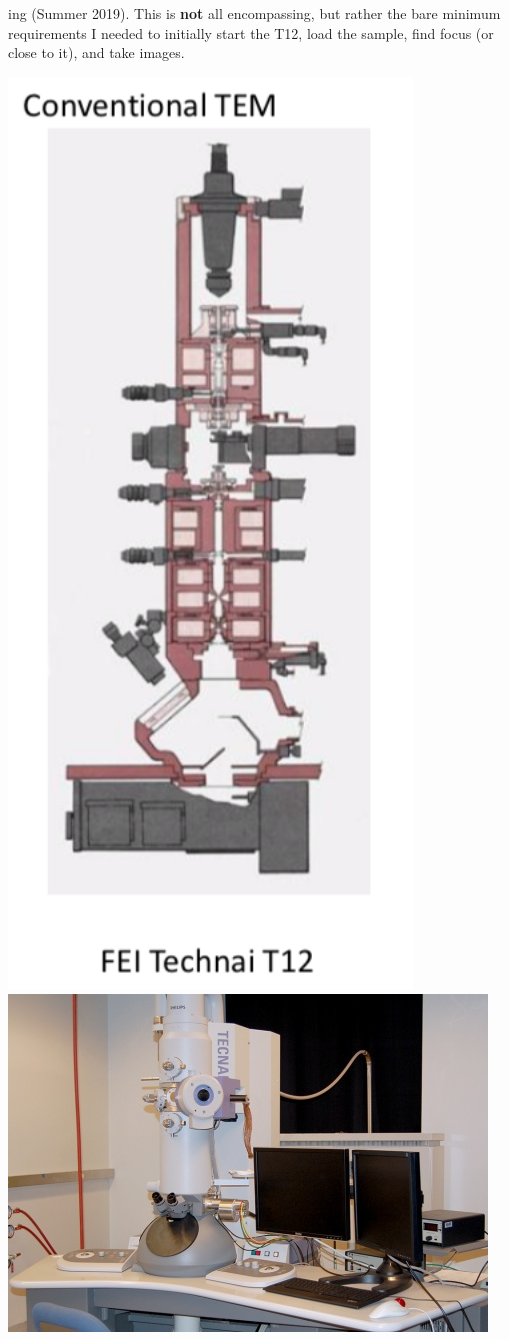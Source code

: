 \documentclass[]{book}
\begin{document}
ing (Summer 2019). This is \textbf{not} all encompassing, but rather the bare minimum requirements I needed to initially start the T12, load the sample, find focus (or close to it), and take images.

\includegraphics[width=4.22in]{images/tecnai_t12} \includegraphics{images/fei-tecnai-t12.jpg}
\end{document}

